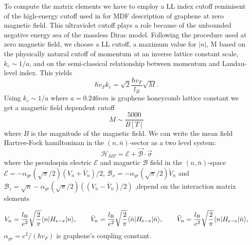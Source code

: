 \documentclass{ws-ijmpb}
\begin{document}
To compute the matrix elements we have to employ a LL index cutoff reminisent of the 
high-energy cutoff used in for MDF description of graphene at zero magnetic field.
This ultraviolet cutoff plays a role because of the unbounded negative energy sea of the 
massless Dirac model.  Following the procedure used at zero magnetic field,
we choose a LL cutoff, a maximum value for $|n|$,  
M based on the physically natural cutoff of momentum at an inverse 
lattice constant scale, $k_c \sim 1/a$, and on the semi-classical relationship between 
momentum and Landau-level index.  This yields
\begin{equation}  
\hbar v_{F} k_{c} = \sqrt{2} \frac{\hbar v_{F}}{l_{B}} \sqrt{M}.
\end{equation}
Using $k_{c} \sim 1/a$ where $a= 0.246nm$ is 
graphene honeycomb lattice constant we get a magnetic field dependent cutoff 
\begin{equation}
M \sim \frac{5000}{B[T]}
\end{equation}
where $B$ is the magnitude of the magnetic field. We can 
write the mean field Hartree-Fock hamiltoninan in the $(n,\bar{n})$-sector as a 
two level system:
\begin{equation}
\mathcal{H}_{MF} = \mathcal{E} + \vec{\mathcal{B}} \cdot \vec{\sigma}
\label{hmf}
\end{equation}
where the pseudospin electric $\mathcal{E}$ and magnetic $\mathcal{B}$ field in the 
$(n,\bar{n})$-space $\mathcal{E} = - \alpha_{gr}(\sqrt{\pi}/2)  (V_{n} + 
\bar{V}_{n})/2 $, $\mathcal{B}_{x} =   - \alpha_{gr}(\sqrt{\pi}/2) \tilde{V}_{n}$ 
and $\mathcal{B}_{z} =  \sqrt{n} - \alpha_{gr}(\sqrt{\pi}/2) ((V_{n} - 
\bar{V}_{n})/2)$ ,depend on the interaction matrix elements 

\begin{equation}
V_{n} = \frac{l_{\rm B}}{e^{2}} \sqrt{\frac{2}{\pi}} \langle n| H_{e-e} | n \rangle,
\qquad \bar{V}_{n} = \frac{l_{\rm B}}{e^{2}} \sqrt{\frac{2}{\pi}} \langle \bar{n}|
H_{e-e} | \bar{n} \rangle, \qquad \tilde{V}_{n} = \frac{l_{\rm B}}{e^{2}}
\sqrt{\frac{2}{\pi}} \langle n| H_{e-e} | \bar{n} \rangle,
\label{twobytwo}
\end{equation}
$\alpha_{gr} = e^{2}/(\hbar v_{F})$ is graphene's coupling constant.
\end{document}

